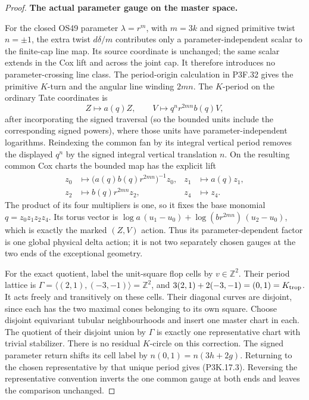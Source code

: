 \begin{proof}
\par\medskip\noindent\textbf{The actual parameter gauge on the master space.}\enspace

For the closed OS49 parameter \(\lambda=r^m\), with
\(m=3k\) and signed primitive twist \(n=\pm1\), the
extra twist \(d\delta/m\) contributes only a parameter-independent
scalar to the finite-cap line map.  Its source coordinate is unchanged;
the same scalar extends in the Cox lift and across the joint cap.
It therefore introduces no parameter-crossing line class.  The
period-origin calculation in P3F.32 gives the primitive
\(K\)-turn and the angular line winding \(2mn\).
The \(K\)-period on the ordinary Tate coordinates is
\[
      Z\longmapsto a(q)Z,\qquad
      V\longmapsto q^n r^{2mn}b(q)V,
\]
after incorporating the signed traversal (so the bounded units
include the corresponding signed powers), where those units
have parameter-independent logarithms.  Reindexing
the common fan by its integral vertical period removes the
displayed \(q^n\) by the signed integral vertical translation
\(n\).  On the resulting common Cox charts the
bounded map has the explicit lift
\[
 \begin{aligned}
 z_0&\longmapsto\bigl(a(q)b(q)r^{2mn}\bigr)^{-1}z_0,
       &z_1&\longmapsto a(q)z_1,\\
 z_2&\longmapsto b(q)r^{2mn}z_2,
       &z_4&\longmapsto z_4.
 \end{aligned}                                      \tag{P3K.17.3}
\]
The product of its four multipliers is one, so it fixes the
base monomial \(q=z_0z_1z_2z_4\).  Its torus vector is
\(\log a\,(u_1-u_0)+\log(br^{2mn})\,(u_2-u_0)\),
which is exactly the marked \((Z,V)\) action.  Thus its
parameter-dependent factor is one global physical delta
action; it is not two separately chosen gauges at the two
ends of the exceptional geometry.

For the exact quotient, label the unit-square flop cells by
\(v\in\mathbb Z^2\).  Their period lattice is
\(\Gamma=\langle(2,1),(-3,-1)\rangle=\mathbb Z^2\),
and \(3(2,1)+2(-3,-1)=(0,1)=K_{\rm trop}\).
It acts freely and transitively on these cells.  Their diagonal
curves are disjoint, since each has the two maximal cones
belonging to its own square.  Choose disjoint equivariant
tubular neighbourhoods and insert one master chart in each.
The quotient of their disjoint union by \(\Gamma\) is
exactly one representative chart with trivial stabilizer.
There is no residual \(K\)-circle on this correction.
The signed parameter return shifts its cell label by
\(n(0,1)=n(3h+2g)\).  Returning to the chosen representative
by that unique period gives (P3K.17.3).  Reversing the
representative convention inverts the one common gauge at
both ends and leaves the comparison unchanged.


\end{proof}
